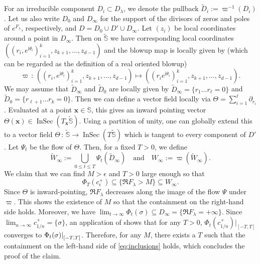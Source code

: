 \documentclass[11pt, a4paper]{article}
\numberwithin{theorem}{section}
\theoremstyle{remark}
\DeclareMathOperator{\IS}{InSec}
\renewcommand{\Re}{\mathfrak{R}}
\newcommand{\bb}[1]{\boldsymbol{#1}}
\newcommand{\Sc}{\mathbb{S}}
\renewcommand{\i}{\mathrm{i}}
\newcommand\restr[2]{{%
  \left.\kern-\nulldelimiterspace %
  #1 %
  \littletaller %
  \right|_{#2} %
  }}
\newcommand{\littletaller}{\mathchoice{\vphantom{\big|}}{}{}{}}
\theoremstyle{theorem}
\begin{document}
For an irreducible component $D_i\subset D_\lambda$, we denote the pullback $\widetilde{D}_i := \varpi^{-1}(D_i)$. Let us also write $D_0$ and $D_\infty$ for the support of the divisors of zeros and poles of $e^{F_\lambda}$, respectively, and $D = D_0 \cup D' \cup D_\infty$. Let $(z_i)$ be local coordinates around a point in $D_\infty$. Then on $\widetilde{\Sc}$ we have corresponding local coordinates $((r_i, e^{\i \theta_i})_{i=1}^k, z_{k+1},\dots,z_{d-1})$ and the blowup map is locally given by (which can be regarded as the definition of a real oriented blowup)
\begin{equation}
  \label{eq:blowup}
  \varpi \,:\, ((r_i, e^{\i \theta_i})_{i=1}^k, z_{k+1},\dots,z_{d-1}) \mapsto ((r_i e^{\i \theta_i})_{i=1}^k, z_{k+1},\dots,z_{d-1}).
\end{equation}
We may assume that $\widetilde{D}_\infty$ and $\widetilde{D}_0$ are locally given by $\widetilde{D}_\infty = \{r_1\dots r_\ell = 0\}$ and $\widetilde{D}_0 = \{r_{\ell+1}\dots r_k=0\}$. 
Then we can define a vector field locally via $\Theta = \sum_{i=1}^{\ell} \partial_{r_i}$. Evaluated at a point $\bb{x}\in\Sc$, this gives an inward pointing vector $\Theta(\bb{x}) \in \IS(T_{\bb{x}}\widetilde{\Sc})$. 
Using a partition of unity, one can globally extend this to a vector field $\Theta\,:\, \widetilde{\Sc} \rightarrow \IS(T\widetilde{\Sc})$ which is tangent to every component of $D'$. Let $\Psi_t$ be the flow of $\Theta$. 
Then, for a fixed $T>0$, we define 
\[
  \widetilde{W}_\infty := \bigcup_{0\leq t\leq T} \Psi_t(\widetilde{D}_\infty) \quad\text{and}\quad W_\infty := \varpi(\widetilde{W}_\infty).
\]
We claim that we can find $M>\epsilon$ and $T>0$ large enough so that 
\begin{equation}
  \label{eq:inclusions}
  \Phi_T(c_\epsilon^+) \subseteq \{\Re F_\lambda > M\} \subseteq W_\infty.
\end{equation}
Since $\Theta$ is inward-pointing, $\Re F_\lambda$ decreases along the image of the flow $\Psi$ under $\varpi$. This shows the existence of $M$ so that the containment on the right-hand side holds. Moreover, we have $\lim_{t\to\infty} \Phi_t(\sigma) \subseteq D_\infty = \{\Re F_\lambda = +\infty\}$. Since $\lim_{n\to\infty} c^+_{1/n} = \{\sigma\}$, an application of \cite[Lemma 8.4.5]{jost2017Riemannian} shows that for any $T>0$, $\Phi_t(c^+_{1/n})|_{[-T,T]}$ converges to $\restr{\Phi_t(\sigma)}{[-T,T]}$. Therefore, for any $M$, there exists a $T$ such that the containment on the left-hand side of \eqref{eq:inclusions} holds, which concludes the proof of the claim. \par
\end{document}
